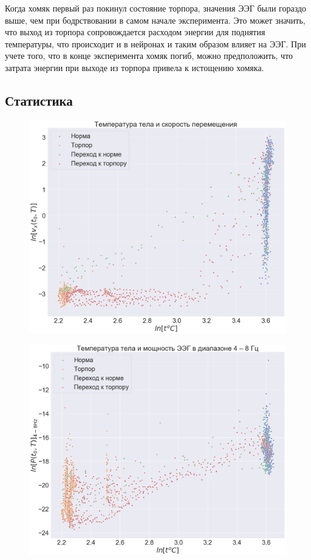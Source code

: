 \documentclass[12pt,a4paper,oneside]{article}
\begin{document}
Когда хомяк первый раз покинул состояние торпора, значения ЭЭГ были гораздо выше, чем при бодрствовании в самом начале эксперимента. Это может значить, что выход из торпора сопровождается расходом энергии для поднятия температуры, что происходит и в нейронах и таким образом влияет на ЭЭГ. При учете того, что в конце эксперимента хомяк погиб, можно предположить, что затрата энергии при выходе из торпора привела к истощению хомяка.

\subsection{Статистика}

\begin{figure}[H]
\centering
\begin{minipage}{.5\textwidth}
  \centering
  \includegraphics[width=\textwidth]{t_vs_speed.png}
  \label{fig:t_vs_speed}
\end{minipage}%
\begin{minipage}{.5\textwidth}
  \centering
  \includegraphics[width=\textwidth]{t_vs_p.png}
  \label{fig:t_vs_p}
\end{minipage}
\end{figure}
\end{document}

